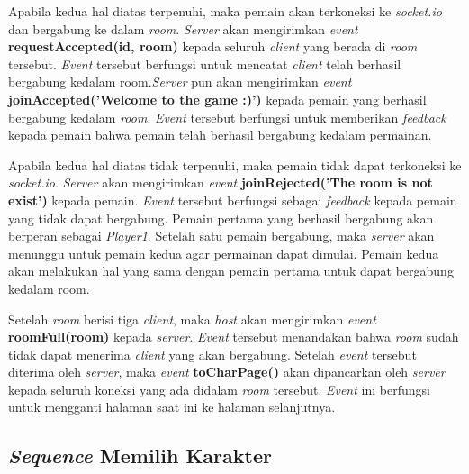 Apabila kedua hal diatas terpenuhi, maka pemain akan terkoneksi ke \textit{socket.io} dan bergabung ke dalam \textit{room}. \textit{Server} akan mengirimkan \textit{event} \textbf{requestAccepted(id, room)} kepada seluruh \textit{client} yang berada di \textit{room} tersebut. \textit{Event} tersebut berfungsi untuk mencatat \textit{client} telah berhasil bergabung kedalam room.\textit{Server} pun akan mengirimkan \textit{event} \textbf{joinAccepted('Welcome to the game :)')} kepada pemain yang berhasil bergabung kedalam \textit{room}. \textit{Event} tersebut berfungsi untuk memberikan \textit{feedback} kepada pemain bahwa pemain telah berhasil bergabung kedalam permainan.

Apabila kedua hal diatas tidak terpenuhi, maka pemain tidak dapat terkoneksi ke \textit{socket.io}. \textit{Server} akan mengirimkan \textit{event} \textbf{joinRejected('The room is not exist')} kepada pemain. \textit{Event} tersebut berfungsi sebagai \textit{feedback} kepada pemain yang tidak dapat bergabung. Pemain pertama yang berhasil bergabung akan berperan sebagai \textit{Player1}. Setelah satu pemain bergabung, maka \textit{server} akan menunggu untuk pemain kedua agar permainan dapat dimulai. Pemain kedua akan melakukan hal yang sama dengan pemain pertama untuk dapat bergabung kedalam room.

Setelah \textit{room} berisi tiga \textit{client}, maka \textit{host} akan mengirimkan \textit{event} \textbf{roomFull(room)} kepada \textit{server}. \textit{Event} tersebut menandakan bahwa \textit{room} sudah tidak dapat menerima \textit{client} yang akan bergabung. Setelah \textit{event} tersebut diterima oleh \textit{server}, maka \textit{event} \textbf{toCharPage()} akan dipancarkan oleh \textit{server} kepada seluruh koneksi yang ada didalam \textit{room} tersebut. \textit{Event} ini berfungsi untuk mengganti halaman saat ini ke halaman selanjutnya.

\subsection{\textit{Sequence} Memilih Karakter}

